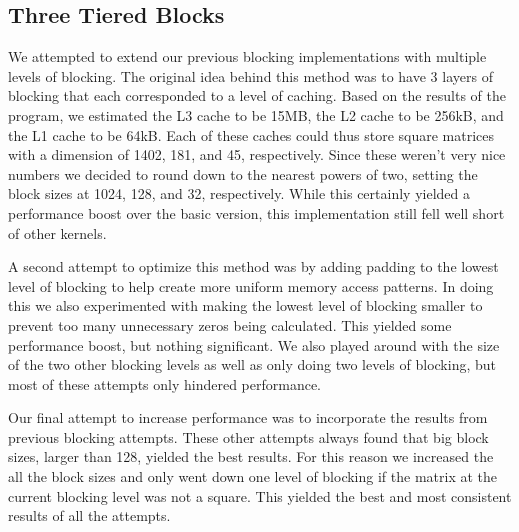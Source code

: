 \subsection{Three Tiered Blocks}
We attempted to extend our previous blocking implementations with multiple
levels of blocking. The original idea behind this method was to have 3 layers 
of blocking that each corresponded to a level of caching. Based on the results 
of the  program, we estimated the L3 cache to be 15MB, the L2 cache to 
be 256kB, and the L1 cache to be 64kB. Each of these caches could thus store 
square matrices with a dimension of 1402, 181, and 45, respectively. Since 
these weren't very nice numbers we decided to round down to the nearest powers of two,
setting the block sizes at 1024, 128, and 32, respectively. While this 
certainly yielded a performance boost over the basic version, this 
implementation still fell well short of other kernels.

A second attempt to optimize this method was by adding padding to the lowest 
level of blocking to help create more uniform memory access patterns. In doing 
this we also experimented with making the lowest level of blocking smaller to 
prevent too many unnecessary zeros being calculated. This yielded some 
performance boost, but nothing significant. We also played around with the 
size of the two other blocking levels as well as only doing two levels of 
blocking, but most of these attempts only hindered performance.

Our final attempt to increase performance was to incorporate the results from 
previous blocking attempts. These other attempts always found that big block 
sizes, larger than 128, yielded the best results. For this reason we increased 
the all the block sizes and only went down one level of blocking if the matrix 
at the current blocking level was not a square. This yielded the best and most 
consistent results of all the attempts.